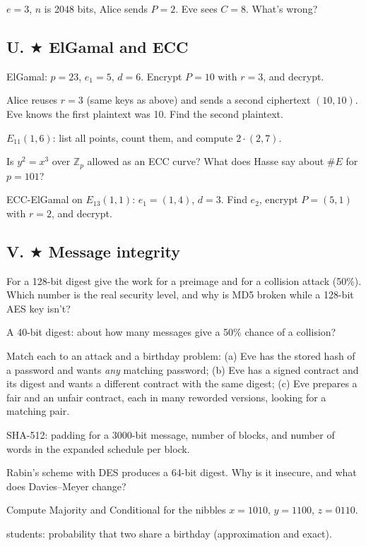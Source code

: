 \q $e = 3$, $n$ is 2048 bits, Alice sends $P = 2$. Eve sees $C = 8$. What's wrong?

\subsection*{U. $\bigstar$ ElGamal and ECC}
\q ElGamal: $p = 23$, $e_1 = 5$, $d = 6$. Encrypt $P = 10$ with $r = 3$, and decrypt.

\q Alice reuses $r = 3$ (same keys as above) and sends a second ciphertext $(10, 10)$. Eve knows the first plaintext was 10. Find the second plaintext.

\q $E_{11}(1, 6)$: list all points, count them, and compute $2 \cdot (2, 7)$.

\q Is $y^2 = x^3$ over $\mathbb{Z}_{p}$ allowed as an ECC curve? What does Hasse say about $\#E$ for $p = 101$?

\q ECC-ElGamal on $E_{13}(1, 1)$: $e_1 = (1, 4)$, $d = 3$. Find $e_2$, encrypt $P = (5, 1)$ with $r = 2$, and decrypt.

\subsection*{V. $\bigstar$ Message integrity}
\q For a 128-bit digest give the work for a preimage and for a collision attack (50\%). Which number is the real security level, and why is MD5 broken while a 128-bit AES key isn't?

\q A 40-bit digest: about how many messages give a 50\% chance of a collision?

\q Match each to an attack and a birthday problem: (a) Eve has the stored hash of a password and wants \emph{any} matching password; (b) Eve has a signed contract and its digest and wants a different contract with the same digest; (c) Eve prepares a fair and an unfair contract, each in many reworded versions, looking for a matching pair.

\q SHA-512: padding for a 3000-bit message, number of blocks, and number of words in the expanded schedule per block.

\q Rabin's scheme with DES produces a 64-bit digest. Why is it insecure, and what does Davies--Meyer change?

\q Compute Majority and Conditional for the nibbles $x = 1010$, $y = 1100$, $z = 0110$.

 students: probability that two share a birthday (approximation and exact).

\clearpage
